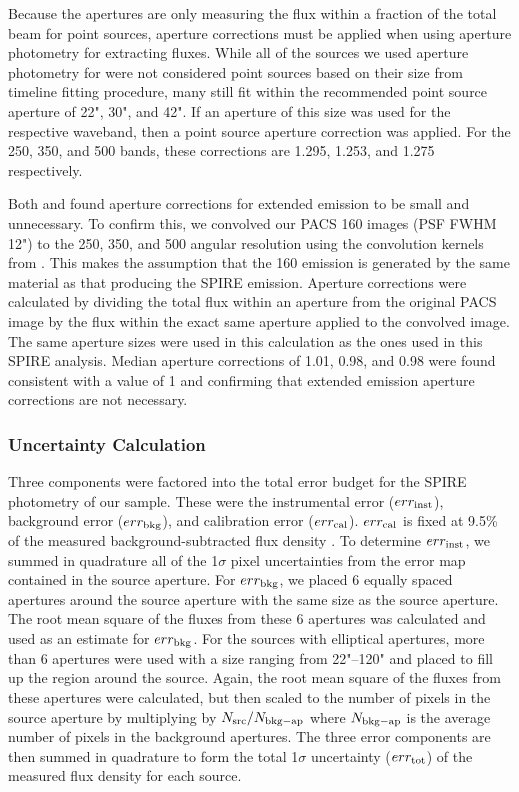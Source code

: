 Because the apertures are only measuring the flux within a fraction of the total beam for point sources, aperture corrections must be applied when using aperture photometry for extracting fluxes. While all of the sources we used aperture photometry for were not considered point sources based on their size from timeline fitting procedure, many still fit within the recommended point source aperture of 22", 30", and 42". If an aperture of this size was used for the respective waveband, then a point source aperture correction was applied. For the 250, 350, and 500 \um{} bands, these corrections are 1.295, 1.253, and 1.275 respectively. 

Both \citet{Ciesla:2012lq} and \citet{Dale:2012dq} found aperture corrections for extended emission to be small and unnecessary.  To confirm this, we convolved our PACS 160 \um{} images (PSF FWHM 12") to the 250, 350, and 500 \um{} angular resolution using the convolution kernels from \citet{Aniano:2011rr}. This makes the assumption that the 160 \um{} emission is generated by the same material as that producing the SPIRE emission. Aperture corrections were calculated by dividing the total flux within an aperture from the original PACS image by the flux within the exact same aperture applied to the convolved image. The same aperture sizes were used in this calculation as the ones used in this SPIRE analysis. Median aperture corrections of 1.01, 0.98, and 0.98 were found consistent with a value of 1 and confirming that extended emission aperture corrections are not necessary.

\subsubsection{Uncertainty Calculation}
Three components were factored into the total error budget for the SPIRE photometry of our sample. These were the instrumental error ($err_{\rm{inst}}$), background error ($err_{\rm{bkg}}$), and calibration error ($err_{\rm{cal}}$). $err_{\rm{cal}}$ is fixed at 9.5\% of the measured background-subtracted flux density \citep{Bendo:2013sd}. To determine $err_{\rm{inst}}$, we summed in quadrature all of the 1$\sigma$ pixel uncertainties from the error map contained in the source aperture. For $err_{\rm{bkg}}$, we placed 6 equally spaced apertures around the source aperture with the same size as the source aperture. The root mean square of the fluxes from these 6 apertures was calculated and used as an estimate for $err_{\rm{bkg}}$. For the sources with elliptical apertures, more than 6 apertures were used with a size ranging from 22"--120" and placed to fill up the region around the source. Again, the root mean square of the fluxes from these apertures were calculated, but then scaled to the number of pixels in the source aperture by multiplying by $N_{\rm{src}}/{N_{\rm{bkg-ap}}}$ where $N_{\rm{bkg-ap}}$ is the average number of pixels in the background apertures. The three error components are then summed in quadrature to form the total 1$\sigma$ uncertainty ($err_{\rm{tot}}$) of the measured flux density for each source.
